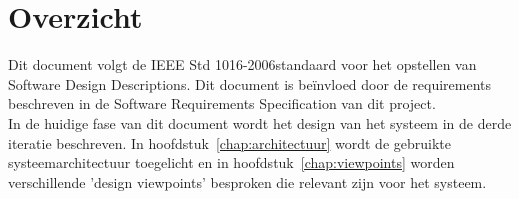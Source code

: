 \section{Overzicht}
Dit document volgt de IEEE Std 1016-2006\texttrademark \space standaard voor het opstellen van Software Design Descriptions. 
Dit document is be\"{i}nvloed door de requirements beschreven in de Software Requirements Specification van dit project.\cite{SRS}\\ 
In de huidige fase van dit document wordt het design van het systeem in de derde iteratie beschreven. 
In hoofdstuk~\ref{chap:architectuur} wordt de gebruikte systeemarchitectuur toegelicht en in hoofdstuk~\ref{chap:viewpoints} worden verschillende 'design viewpoints' besproken die relevant zijn voor het systeem.